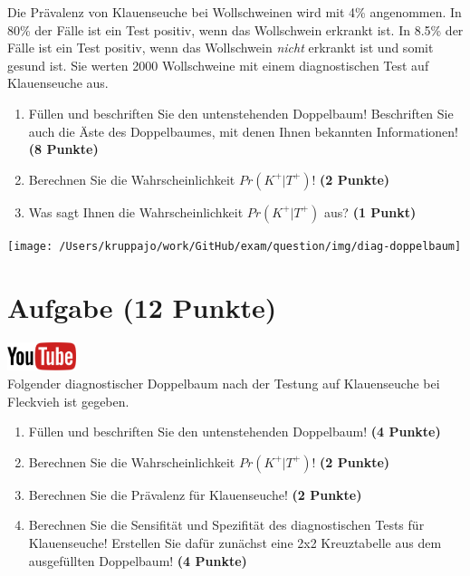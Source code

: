 \documentclass[a4paper, 9pt]{scrartcl}\usepackage[]{graphicx}\usepackage[]{xcolor}
\begin{document}
Die Pr{\"a}valenz von Klauenseuche bei Wollschweinen wird mit
4\% angenommen. In 80\% der F{\"a}lle ist ein Test positiv, wenn das Wollschwein erkrankt
ist. In 8.5\% der F{\"a}lle ist ein Test positiv,
wenn das Wollschwein \textit{nicht} erkrankt ist und somit gesund ist. Sie
werten 2000 Wollschweine mit einem
diagnostischen Test auf Klauenseuche aus.



\begin{enumerate}
\item F{\"u}llen und beschriften Sie den untenstehenden Doppelbaum! Beschriften
  Sie auch die {\"A}ste des Doppelbaumes, mit denen Ihnen bekannten
  Informationen!  \textbf{(8 Punkte)}
\item Berechnen Sie die Wahrscheinlichkeit $Pr(K^+|T^+)$! \textbf{(2 Punkte)}
\item Was sagt Ihnen die Wahrscheinlichkeit $Pr(K^+|T^+)$ aus? \textbf{(1 Punkt)}
\end{enumerate}

\vspace{1cm}

\begin{center}
  \texttt{[image: /Users/kruppajo/work/GitHub/exam/question/img/diag-doppelbaum]}
\end{center}



 
\clearpage

\section{Aufgabe \hfill (12 Punkte)}


\hfill\href{https://youtu.be/_7s44pbOc00}{\includegraphics[width =
  2cm]{img/youtube}}\\[1Ex]





Folgender diagnostischer Doppelbaum nach der Testung auf Klauenseuche bei
Fleckvieh ist gegeben.

\begin{enumerate}
\item F{\"u}llen und beschriften Sie den untenstehenden Doppelbaum! \textbf{(4
    Punkte)}
\item Berechnen Sie die Wahrscheinlichkeit $Pr(K^+|T^+)$! \textbf{(2 Punkte)}
\item Berechnen Sie die Pr{\"a}valenz f{\"u}r Klauenseuche! \textbf{(2 Punkte)}
\item Berechnen Sie die Sensifit{\"a}t und Spezifit{\"a}t des diagnostischen Tests
  f{\"u}r Klauenseuche! Erstellen Sie daf{\"u}r zun{\"a}chst eine 2x2 Kreuztabelle aus
  dem ausgef{\"u}llten Doppelbaum!
  \textbf{(4 Punkte)}
\end{enumerate}
\end{document}
